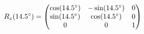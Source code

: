 \documentclass[preview]{standalone}
\begin{document}
\begin{align*}
\special{dvisvgm:raw <g id='unique000'>}R_z(14.5^\circ) = \begin{pmatrix} \cos(14.5^\circ) & -\sin(14.5^\circ) & 0 \\ \sin(14.5^\circ) & \cos(14.5^\circ) & 0 \\ 0 & 0 & 1 \end{pmatrix}\special{dvisvgm:raw </g>}
\end{align*}
\end{document}
